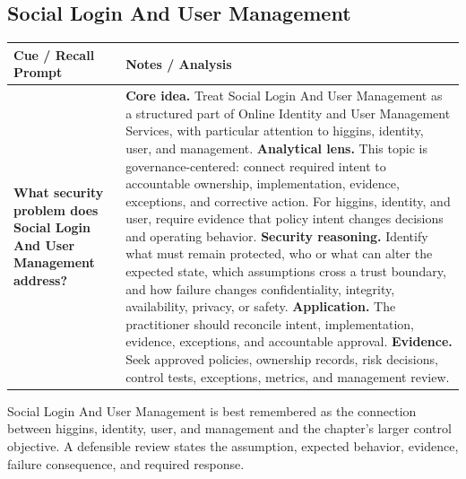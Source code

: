 \documentclass[11pt]{article}
\newcommand{\CornellHeader}{%
\rowcolor{Navy}\color{white}\bfseries Cue / Recall Prompt & \color{white}\bfseries Notes / Analysis\\\hline}
\newcommand{\CornellRow}[2]{%
\cellcolor{CueGray}\RaggedRight\textbf{#1} & \RaggedRight #2\\\hline}
\begin{document}
\subsection*{Social Login And User Management}
\begin{longtable}{>{\RaggedRight\arraybackslash}p{}|>{\RaggedRight\arraybackslash}p{}}
\CornellHeader
\CornellRow{What security problem does Social Login And User Management address?}{\textbf{Core idea.} Treat Social Login And User Management as a structured part of Online Identity and User Management Services, with particular attention to higgins, identity, user, and management. \textbf{Analytical lens.} This topic is governance-centered: connect required intent to accountable ownership, implementation, evidence, exceptions, and corrective action. For higgins, identity, and user, require evidence that policy intent changes decisions and operating behavior. \textbf{Security reasoning.} Identify what must remain protected, who or what can alter the expected state, which assumptions cross a trust boundary, and how failure changes confidentiality, integrity, availability, privacy, or safety. \textbf{Application.} The practitioner should reconcile intent, implementation, evidence, exceptions, and accountable approval. \textbf{Evidence.} Seek approved policies, ownership records, risk decisions, control tests, exceptions, metrics, and management review.}
\end{longtable}
\begin{topicsummary}
Social Login And User Management is best remembered as the connection between higgins, identity, user, and management and the chapter's larger control objective. A defensible review states the assumption, expected behavior, evidence, failure consequence, and required response.
\end{topicsummary}
\end{document}
